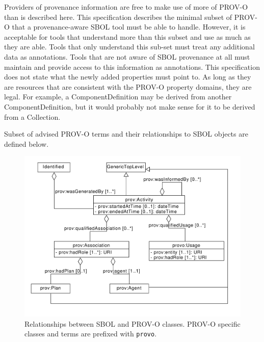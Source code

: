 {Providers of provenance information are free to make use of more of PROV-O than is described here. This specification describes the minimal subset of PROV-O that a provenance-aware SBOL tool must be able to handle. However, it is acceptable for tools that understand more than this subset and use as much as they are able. Tools that only understand this sub-set must treat any additional data as annotations. Tools that are not aware of SBOL provenance at all must maintain and provide access to this information as annotations. This specification does not state what the newly added properties must point to. As long as they are resources that are consistent with the PROV-O property domains, they are legal. For example, a ComponentDefinition may be derived from another ComponentDefinition, but it would probably not make sense for it to be derived from a Collection.

Subset of advised PROV-O terms and their relationships to SBOL objects are defined below.

\begin{figure}[ht]
\begin{center}
\includegraphics[scale=0.6]{uml/provenance}
\caption[]{Relationships between SBOL and PROV-O classes. PROV-O specific classes and terms are prefixed with \texttt{provo}.}
\label{uml:provenance}
\end{center}
\end{figure}

}
